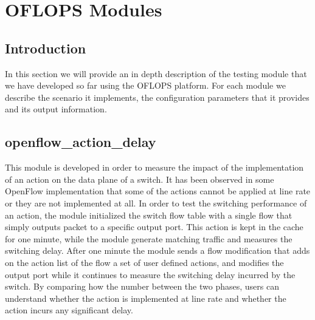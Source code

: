 \documentclass{book}
\begin{document}
% 
% 
% 

\chapter{OFLOPS Modules}
\label{oflops-modules}

\section{Introduction}

In this section we will provide an in depth description of the testing module
that we have developed  so far using the OFLOPS platform. For each module we describe
the scenario it implements, the configuration parameters that it provides and
its output information. 

\section{openflow\_action\_delay}        

This module is developed in order to measure the impact of the implementation 
of an action on the data plane of a switch. It has been observed in 
some OpenFlow implementation that some of the actions cannot be applied at 
line rate or they are not implemented at all. In order to test the switching
performance of an action, the module initialized the switch flow table with a
single flow that simply outputs packet to a specific output port. This action is
kept in the cache for one minute, while the module generate matching traffic and
measures the switching delay. After one minute the module sends a flow
modification that adds on the action list of the flow a set of user defined
actions, and modifies the output port while it continues to measure the switching 
delay incurred by the switch. By comparing how the number between the two
phases, users can understand whether the action is implemented at line rate and
whether the action incurs any significant delay. 
\end{document}
